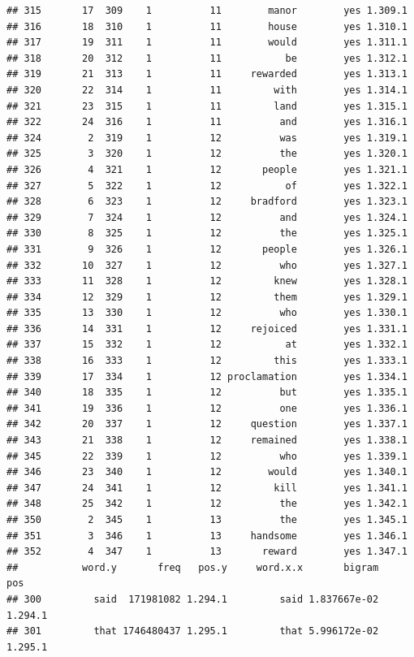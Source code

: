 \documentclass{article}\usepackage[]{graphicx}\usepackage[]{color}
\makeatletter
\newenvironment{kframe}{%
 \def\at@end@of@kframe{}%
 \ifinner\ifhmode%
  \def\at@end@of@kframe{\end{minipage}}%
  \begin{minipage}{\columnwidth}%
 \fi\fi%
 \def\FrameCommand##1{\hskip\@totalleftmargin \hskip-\fboxsep
 \colorbox{shadecolor}{##1}\hskip-\fboxsep
     \hskip-\linewidth \hskip-\@totalleftmargin \hskip\columnwidth}%
 \MakeFramed {\advance\hsize-\width
   \@totalleftmargin\z@ \linewidth\hsize
   \@setminipage}}%
 {\par\unskip\endMakeFramed%
 \at@end@of@kframe}
\newenvironment{knitrout}{}{} %
\makeatother
\begin{document}
\begin{knitrout}
\begin{kframe}
\begin{verbatim}
## 315       17  309    1          11        manor        yes 1.309.1
## 316       18  310    1          11        house        yes 1.310.1
## 317       19  311    1          11        would        yes 1.311.1
## 318       20  312    1          11           be        yes 1.312.1
## 319       21  313    1          11     rewarded        yes 1.313.1
## 320       22  314    1          11         with        yes 1.314.1
## 321       23  315    1          11         land        yes 1.315.1
## 322       24  316    1          11          and        yes 1.316.1
## 324        2  319    1          12          was        yes 1.319.1
## 325        3  320    1          12          the        yes 1.320.1
## 326        4  321    1          12       people        yes 1.321.1
## 327        5  322    1          12           of        yes 1.322.1
## 328        6  323    1          12     bradford        yes 1.323.1
## 329        7  324    1          12          and        yes 1.324.1
## 330        8  325    1          12          the        yes 1.325.1
## 331        9  326    1          12       people        yes 1.326.1
## 332       10  327    1          12          who        yes 1.327.1
## 333       11  328    1          12         knew        yes 1.328.1
## 334       12  329    1          12         them        yes 1.329.1
## 335       13  330    1          12          who        yes 1.330.1
## 336       14  331    1          12     rejoiced        yes 1.331.1
## 337       15  332    1          12           at        yes 1.332.1
## 338       16  333    1          12         this        yes 1.333.1
## 339       17  334    1          12 proclamation        yes 1.334.1
## 340       18  335    1          12          but        yes 1.335.1
## 341       19  336    1          12          one        yes 1.336.1
## 342       20  337    1          12     question        yes 1.337.1
## 343       21  338    1          12     remained        yes 1.338.1
## 345       22  339    1          12          who        yes 1.339.1
## 346       23  340    1          12        would        yes 1.340.1
## 347       24  341    1          12         kill        yes 1.341.1
## 348       25  342    1          12          the        yes 1.342.1
## 350        2  345    1          13          the        yes 1.345.1
## 351        3  346    1          13     handsome        yes 1.346.1
## 352        4  347    1          13       reward        yes 1.347.1
##           word.y       freq   pos.y     word.x.x       bigram     pos
## 300         said  171981082 1.294.1         said 1.837667e-02 1.294.1
## 301         that 1746480437 1.295.1         that 5.996172e-02 1.295.1

\end{verbatim}
\end{kframe}
\end{knitrout}
\end{document}
